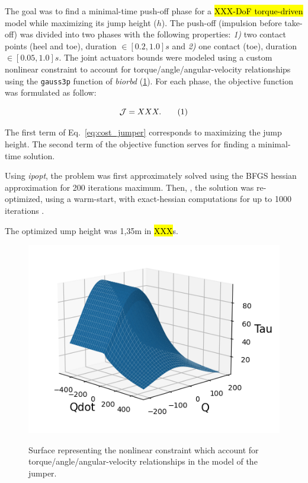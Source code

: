 The goal was to find a minimal-time push-off phase for a \hl{XXX-DoF torque-driven} model while maximizing its jump height ($h$).
The push-off (impulsion before take-off) was divided into two phases with the following properties: \textit{1)} two contact points (heel and toe), duration $\in [0.2, 1.0]s$ and \textit{2)} one contact (toe), duration $\in [0.05, 1.0]s$.
The joint actuators bounds were modeled using a custom nonlinear constraint to account for torque/angle/angular-velocity relationships using the \verb?gauss3p? function of \textit{biorbd}  (\ref{fig:graph_force_vitesse_longueur}).
For each phase, the objective function was formulated as follow:

\[
\mathcal{J} = XXX.
\addtag
\label{eq:cost_jumper}
\]

The first term of Eq.~\ref{eq:cost_jumper} corresponds to maximizing the jump height.
The second term of the objective function serves for finding a minimal-time solution.

Using \textit{ipopt}, the problem was first approximately solved using the BFGS hessian approximation for 200 iterations maximum.
Then, , the solution was re-optimized, using a warm-start, with exact-hessian computations for up to 1000 iterations .

The optimized ump height was 1,35m in \hl{XXX}s.

\begin{figure}[h!]
\includegraphics[width=\columnwidth]{figures/graph_force_vitesse_longueur.png}\\
\caption{Surface representing the nonlinear constraint which account for torque/angle/angular-velocity relationships in the model of the jumper.}
\label{fig:graph_force_vitesse_longueur}
\end{figure}
